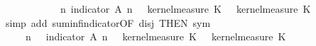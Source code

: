\begin{isabellebody}
\ \ \ \ \ \ \ \ {\isasymintegral}\isactrlsup {\isacharplus}{\kern0pt}\ {\isasymomega}\ {\isasymintegral}\isactrlsup {\isacharplus}{\kern0pt}\ {\isasymomega}\ {\isacharparenleft}{\kern0pt}{\isasymSum}n{\isachardot}{\kern0pt}\ indicator\ {\isacharparenleft}{\kern0pt}A\ n{\isacharparenright}{\kern0pt}\ {\isacharparenleft}{\kern0pt}{\isasymomega}\ {\isasymomega}\ {\isasympartial}kernel{\isacharunderscore}{\kern0pt}measure\ K{\isacharunderscore}{\kern0pt}{}\ {\isacharparenleft}{\kern0pt}{\isasymomega}\ {\isasymomega}\ {\isasympartial}kernel{\isacharunderscore}{\kern0pt}measure\ K{\isacharunderscore}{\kern0pt}{}\ {\isasymomega}\isanewline
\ \ \ \ \ \ \isamarkupfalse%
\ {\isacharparenleft}{\kern0pt}simp\ add{\isacharcolon}{\kern0pt}\ suminf{\isacharunderscore}{\kern0pt}indicator{\isacharbrackleft}{\kern0pt}OF\ disj{\isacharcomma}{\kern0pt}\ THEN\ sym{\isacharbrackright}{\kern0pt}{\isacharparenright}{\kern0pt}\isanewline
\ \ \ \ \isamarkupfalse%
\ \isamarkupfalse%
\ {\isachardoublequoteopen}{\isachardot}{\kern0pt}{\isachardot}{\kern0pt}{\isachardot}{\kern0pt}\ {\isacharequal}{\kern0pt}\ {\isasymintegral}\isactrlsup {\isacharplus}{\kern0pt}\ {\isasymomega}\ {\isacharparenleft}{\kern0pt}{\isasymSum}n{\isachardot}{\kern0pt}\ {\isasymintegral}\isactrlsup {\isacharplus}{\kern0pt}\ {\isasymomega}\ indicator\ {\isacharparenleft}{\kern0pt}A\ n{\isacharparenright}{\kern0pt}\ {\isacharparenleft}{\kern0pt}{\isasymomega}\ {\isasymomega}\ {\isasympartial}kernel{\isacharunderscore}{\kern0pt}measure\ K{\isacharunderscore}{\kern0pt}{}\ {\isacharparenleft}{\kern0pt}{\isasymomega}\ {\isasymomega}\ {\isasympartial}kernel{\isacharunderscore}{\kern0pt}measure\ K{\isacharunderscore}{\kern0pt}{}\ {\isasymomega}\isanewline

\end{isabellebody}
